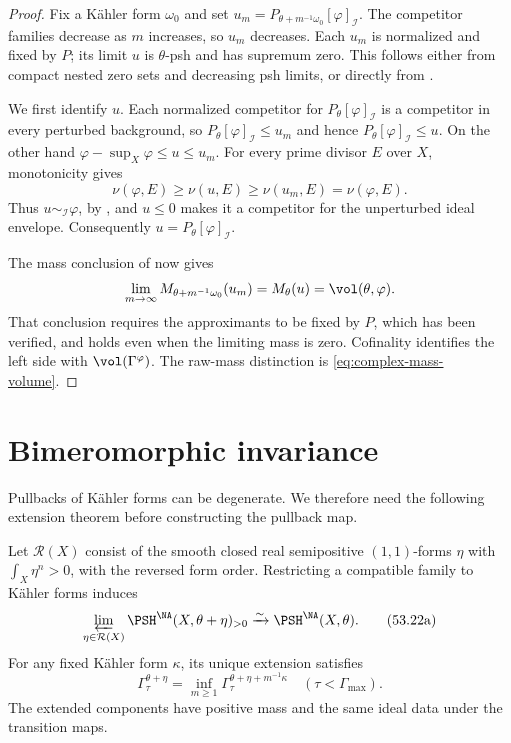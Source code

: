 \begin{proof}
Fix a K\"ahler form $\omega_0$ and set
$u_m=P_{\theta+m^{-1}\omega_0}[\varphi]_{\mathcal I}$.
The competitor families decrease as $m$ increases, so $u_m$ decreases.
Each $u_m$ is normalized and fixed by $P$; its limit $u$ is
$\theta$-psh and has supremum zero.  This follows either from compact
nested zero sets and decreasing psh limits, or directly from
\cite[Proposition~3.1.12]{XiaBook}.

We first identify $u$.  Each normalized competitor for
$P_\theta[\varphi]_{\mathcal I}$ is a competitor in every perturbed
background, so
$P_\theta[\varphi]_{\mathcal I}\leq u_m$ and hence
$P_\theta[\varphi]_{\mathcal I}\leq u$.
On the other hand $\varphi-\sup_X\varphi\leq u\leq u_m$.
For every prime divisor $E$ over $X$, monotonicity gives
\[
 \nu(\varphi,E)\geq\nu(u,E)\geq\nu(u_m,E)=\nu(\varphi,E).
\]
Thus $u\sim_{\mathcal I}\varphi$, by
, and $u\leq0$ makes it a competitor
for the unperturbed ideal envelope.  Consequently
$u=P_\theta[\varphi]_{\mathcal I}$.

The mass conclusion of \cite[Proposition~3.1.12]{XiaBook} now gives
\[
 \lim_{m\to\infty}M_{\theta+m^{-1}\omega_0}(u_m)
 =M_\theta(u)=\vol(\theta,\varphi).
\]
That conclusion requires the approximants to be fixed by $P$, which
has been verified, and holds even when the limiting mass is zero.
Cofinality identifies the left side with $\vol(\Gamma^\varphi)$.
The raw-mass distinction is \eqref{eq:complex-mass-volume}.
\end{proof}

\section{Bimeromorphic invariance}
\label{sec:tna-bimeromorphic}

Pullbacks of K\"ahler forms can be degenerate.  We therefore need the
following extension theorem before constructing the pullback map.

\par\noindent\begin{minipage}{\textwidth}
\begin{theorem}
\label{thm:tna-semipositive-extension}
Let $\mathcal R(X)$ consist of the smooth closed real semipositive
$(1,1)$-forms $\eta$ with $\int_X\eta^n>0$, with the reversed form
order.  Restricting a compatible family to K\"ahler forms induces
\[
 \varprojlim_{\eta\in\mathcal R(X)}
       \PSH^{\NA}(X,\theta+\eta)_{>0}
 \xrightarrow{\sim}\PSH^{\NA}(X,\theta).
\tag{53.22a}\label{eq:tna-semipositive-extension}
\]
For any fixed K\"ahler form $\kappa$, its unique extension satisfies
\[
 \Gamma^{\theta+\eta}_\tau
 =\inf_{m\geq1}\Gamma^{\theta+\eta+m^{-1}\kappa}_\tau
 \quad(\tau<\Gamma_{\max}).
\tag{53.22b}\label{eq:tna-semipositive-component}
\]
The extended components have positive mass and the same ideal data
under the transition maps.
\end{theorem}
\end{minipage}\par\medskip

